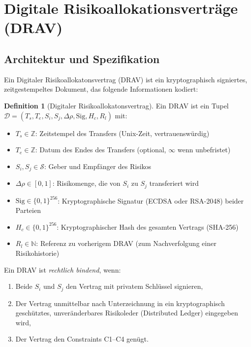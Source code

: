 \documentclass[a4paper,12pt]{article}
\theoremstyle{definition}
\newtheorem{definition}{Definition}
\begin{document}
\section{Digitale Risikoallokationsverträge (DRAV)}

\subsection{Architektur und Spezifikation}

Ein Digitaler Risikoallokatonsvertrag (DRAV) ist ein kryptographisch signiertes, zeitgestempeltes Dokument, das folgende Informationen kodiert:

\begin{definition}[Digitaler Risikoallokatonsvertrag]
Ein DRAV ist ein Tupel $\mathcal{D} = (T_s, T_e, S_i, S_j, \Delta\rho, \text{Sig}, H_c, R_l)$ mit:
\begin{itemize}
    \item $T_s \in \mathbb{Z}$: Zeitstempel des Transfers (Unix-Zeit, vertrauenswürdig)
    \item $T_e \in \mathbb{Z}$: Datum des Endes des Transfers (optional, $\infty$ wenn unbefristet)
    \item $S_i, S_j \in \mathcal{S}$: Geber und Empfänger des Risikos
    \item $\Delta\rho \in [0,1]$: Risikomenge, die von $S_i$ zu $S_j$ transferiert wird
    \item $\text{Sig} \in \{0,1\}^{256}$: Kryptographische Signatur (ECDSA oder RSA-2048) beider Parteien
    \item $H_c \in \{0,1\}^{256}$: Kryptographischer Hash des gesamten Vertrags (SHA-256)
    \item $R_l \in \mathbb{N}$: Referenz zu vorherigem DRAV (zum Nachverfolgung einer Risikohistorie)
\end{itemize}
\end{definition}

Ein DRAV ist \emph{rechtlich bindend}, wenn:
\begin{enumerate}
    \item Beide $S_i$ und $S_j$ den Vertrag mit privatem Schlüssel signieren,
    \item Der Vertrag unmittelbar nach Unterzeichnung in ein kryptographisch geschütztes, unveränderbares Risikoleder (Distributed Ledger) eingegeben wird,
    \item Der Vertrag den Constraints C1--C4 genügt.
\end{enumerate}
\end{document}
